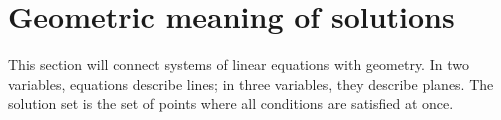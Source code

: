 \section{Geometric meaning of solutions}

This section will connect systems of linear equations with geometry. In two variables, equations describe lines; in three variables, they describe planes. The solution set is the set of points where all conditions are satisfied at once.
